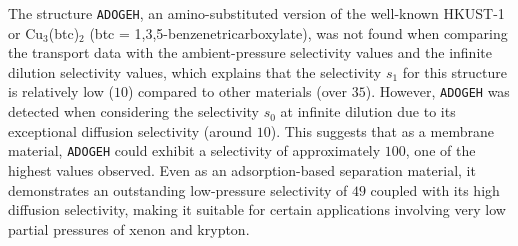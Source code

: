 \documentclass[main]{subfiles}
\begin{document}
The structure \texttt{ADOGEH}\autocite{Peikert_2012}, an amino-substituted version of the well-known HKUST-1 or Cu$_3$(btc)$_2$ (btc = 1,3,5-benzenetricarboxylate), was not found when comparing the transport data with the ambient-pressure selectivity values and the infinite dilution selectivity values, which explains that the selectivity $s_1$ for this structure is relatively low ($10$) compared to other materials (over $35$). However, \texttt{ADOGEH} was detected when considering the selectivity $s_0$ at infinite dilution due to its exceptional diffusion selectivity (around $10$). This suggests that as a membrane material, \texttt{ADOGEH} could exhibit a selectivity of approximately $100$, one of the highest values observed. Even as an adsorption-based separation material, it demonstrates an outstanding low-pressure selectivity of $49$ coupled with its high diffusion selectivity, making it suitable for certain applications involving very low partial pressures of xenon and krypton.
\end{document}
